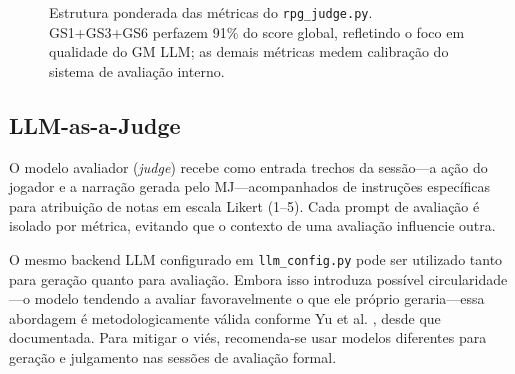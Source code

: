 \documentclass[12pt]{article}
\begin{document}
\begin{figure}[ht]
\centering
{}
\caption{Estrutura ponderada das métricas do \texttt{rpg\_judge.py}. GS1+GS3+GS6 perfazem 91\% do score global, refletindo o foco em qualidade do GM LLM; as demais métricas medem calibração do sistema de avaliação interno.}
\label{fig:metricas}
\end{figure}

\subsection{LLM-as-a-Judge}

O modelo avaliador (\textit{judge}) recebe como entrada trechos da sessão---a ação do jogador e a narração gerada pelo MJ---acompanhados de instruções específicas para atribuição de notas em escala Likert (1--5). Cada prompt de avaliação é isolado por métrica, evitando que o contexto de uma avaliação influencie outra.

O mesmo backend LLM configurado em \texttt{llm\_config.py} pode ser utilizado tanto para geração quanto para avaliação. Embora isso introduza possível circularidade---o modelo tendendo a avaliar favoravelmente o que ele próprio geraria---essa abordagem é metodologicamente válida conforme Yu et al. \cite{yu:2025}, desde que documentada. Para mitigar o viés, recomenda-se usar modelos diferentes para geração e julgamento nas sessões de avaliação formal.
\end{document}
